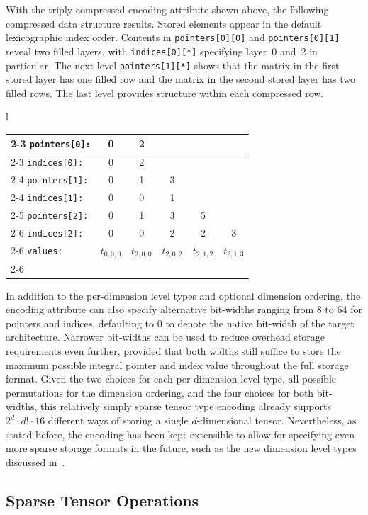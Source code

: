 \documentclass[10pt]{article}
\newcommand{\exam}{\begin{flushleft}\scriptsize\begin{tabular}{l}}
\newcommand{\maxe}{\end{tabular}\end{flushleft}}
\begin{document}
With the triply-compressed encoding attribute shown above, the following compressed data structure results. Stored elements appear in the default lexicographic index order. Contents in \texttt{pointers[0][0]} and \texttt{pointers[0][1]} reveal two filled layers, with \texttt{indices[0][*]} specifying layer~0 and~2 in particular. The next level \texttt{pointers[1][*]} shows that the matrix in the first stored layer has one filled row and the matrix in the second stored layer has two filled rows. The last level provides structure within each compressed row.

\exam
\begin{tabular}{l|c|c|c|c|c|}
\cline{2-3}
\texttt{pointers[0]:}  & 0 & 2 \\
\cline{2-3}
\texttt{indices[0]:}  & 0 & 2 \\
\cline{2-4}
\texttt{pointers[1]:} & 0 & 1 & 3 \\
\cline{2-4}
\texttt{indices[1]:}  & 0 & 0 & 1 \\
\cline{2-5}
\texttt{pointers[2]:} & 0 & 1 & 3 & 5 \\
\cline{2-6}
\texttt{indices[2]:}  & 0 & 0 & 2 & 2 & 3 \\
\cline{2-6}
\texttt{values:}    & $t_{0,0,0}$ & $t_{2,0,0}$ & $t_{2,0,2}$ & $t_{2,1,2}$ & $t_{2,1,3}$ \\
\cline{2-6}
\end{tabular}
\maxe

In addition to the per-dimension level types and optional dimension ordering, the encoding attribute can also specify alternative bit-widths ranging from 8 to 64 for pointers and indices, defaulting to 0 to denote the native bit-width of the target architecture. Narrower bit-widths can be used to reduce overhead storage requirements even further, provided that both widths still suffice to store the maximum possible integral pointer and index value throughout the full storage format.
Given the two choices for each per-dimension level type, all possible permutations for the dimension ordering, and the four choices for both bit-widths, this relatively simply sparse tensor type encoding already supports $2^d \cdot d! \cdot 16$ different ways of storing a single $d$-dimensional tensor. Nevertheless, as stated before, the encoding has been kept extensible to allow for specifying even more sparse storage formats in the future, such as the new dimension level types discussed in~\cite{chou2018}.

\subsection{Sparse Tensor Operations}
\end{document}
